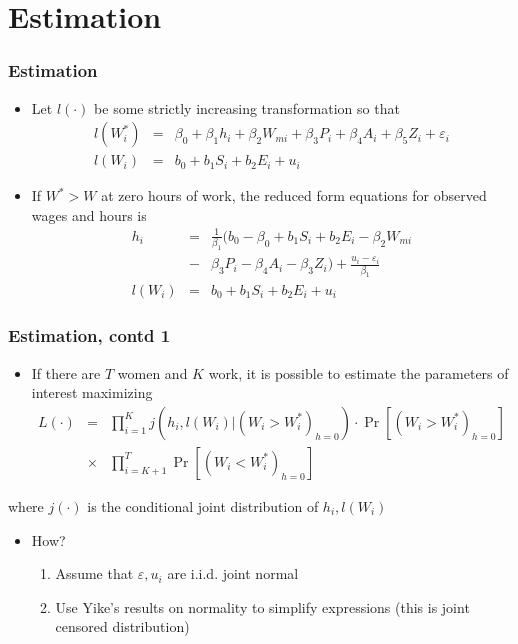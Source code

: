 \section{Estimation}
	\begin{frame}
		\frametitle{Estimation}
			\begin{itemize}
				\item Let $l(\cdot)$ be some strictly increasing transformation so that
					\begin{eqnarray}
						l(W_{i}^*) &=& \beta_{0} + \beta_{1}h_{i} + \beta_{2} W_{mi} + \beta_{3} P_{i} + \beta_{4} A_{i} + \beta_{5} Z_{i} + \varepsilon_{i} \nonumber \\
						l(W_{i}) &=& b_{0} + b_{1} S_{i} + b_{2} E_{i} + u_{i} 
					\end{eqnarray}
				\item If $W^* > W$ at zero hours of work, the reduced form equations for observed wages and hours is
				\begin{eqnarray}
				h_{i} &=& \frac{1}{\beta_{1}} ( b_{0} - \beta_{0} + b_{1} S_{i} + b_{2} E_{i} - \beta_{2} W_{mi} \nonumber \\
				&-& \beta_{3} P_{i} - \beta_{4} A_{i} - \beta_{3} Z_{i} ) + \frac{u_{i} - \varepsilon_{i}}{\beta_{1}} \nonumber \\
				l(W_{i}) &=& b_{0} + b_{1} S_{i} + b_{2} E_{i} + u_{i} 
				\end{eqnarray}
			\end{itemize}
	\end{frame}

\begin{frame}
	\frametitle{Estimation, contd 1}
		\begin{itemize}
			\item If there are $T$ women and $K$ work, it is possible to estimate the parameters of interest maximizing
			\begin{eqnarray}
				L(\cdot) &=& \prod _{i=1} ^{K} j \left( h_{i}, l(W_{i}) | (W_{i} > W_{i}^* )_{h = 0}\right) \cdot \Pr \left[ (W_{i} > W_{i}^* )_{h = 0} \right] \nonumber \\ 
				&\times& \prod _{i=K+1} ^{T} \Pr \left[ (W_{i} < W_{i}^* )_{h = 0} \right]
			\end{eqnarray}
		\end{itemize}
\noindent where $j(\cdot)$ is the conditional joint distribution of $h_{i}, l(W_{i})$
	\begin{itemize}
		\item How?
			\begin{enumerate}
				\item Assume that $\varepsilon, u_{i}$ are i.i.d. joint normal
				\item Use Yike's results on normality to simplify expressions (this is joint censored distribution)
			\end{enumerate}
	\end{itemize}
\end{frame}

